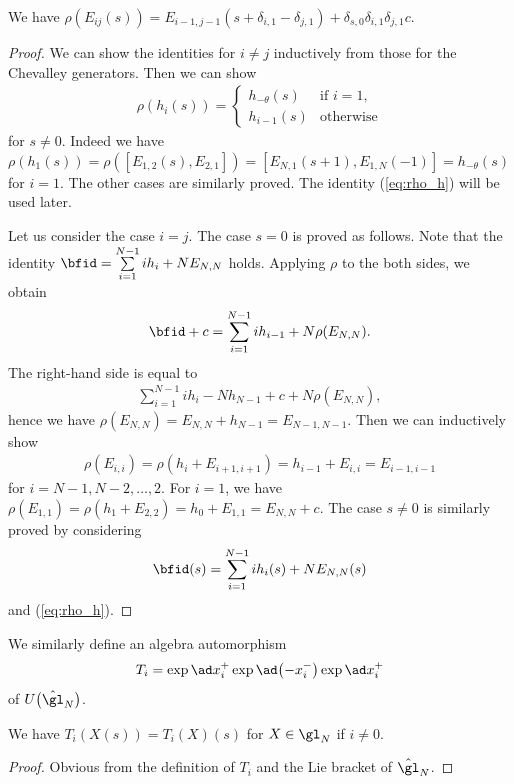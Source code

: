 \begin{lem}\label{lem:rho}We have $\rho(E_{ij}(s)) = E_{i-1,j-1}(s+\delta_{i,1}-\delta_{j,1}) + \delta_{s,0}\delta_{i,1}\delta_{j,1}c$.
\end{lem}
\begin{proof}We can show the identities for $i \neq j$ inductively from those for the Chevalley generators. Then we can show
\begin{gather}
\rho(h_i(s)) = \begin{cases}
h_{-\theta}(s) & \text{if $i=1$},\\
h_{i-1}(s) & \text{otherwise}
\end{cases}\label{eq:rho_h}
\end{gather}
for $s \neq 0$. Indeed we have $\rho(h_1(s)) = \rho([E_{1,2}(s), E_{2,1}]) = [E_{N,1}(s+1), E_{1,N}(-1)] = h_{-\theta}(s)$ for $i=1$. The other cases are similarly proved. The identity (\ref{eq:rho_h}) will be used later.

Let us consider the case $i = j$. The case $s=0$ is proved as follows. Note that the identity $\bfid = \sum\limits_{i=1}^{N-1} i h_i + N E_{N,N}$ holds. Applying $\rho$ to the both sides, we obtain
\begin{gather*}
\bfid + c = \sum_{i=1}^{N-1} i h_{i-1} + N \rho(E_{N,N}).
\end{gather*}
The right-hand side is equal to
\begin{gather*}
\sum_{i=1}^{N-1} i h_i - N h_{N-1} + c + N \rho(E_{N,N}),
\end{gather*}
hence we have $\rho(E_{N,N}) = E_{N,N} + h_{N-1} = E_{N-1,N-1}$. Then we can inductively show
\begin{gather*}
\rho(E_{i,i}) = \rho(h_i + E_{i+1,i+1}) = h_{i-1} + E_{i,i} = E_{i-1,i-1}
\end{gather*}
for $i=N-1,N-2,\ldots,2$. For $i=1$, we have $\rho(E_{1,1}) = \rho(h_1 + E_{2,2}) = h_{0} + E_{1,1} = E_{N,N} + c$. The case $s \neq 0$ is similarly proved by considering
\begin{gather*}
\bfid(s) = \sum_{i=1}^{N-1} i h_i(s) + N E_{N,N}(s)
\end{gather*}
and (\ref{eq:rho_h}).
\end{proof}

We similarly define an algebra automorphism
\begin{gather*}
T_i = \exp\ad x_i^+ \exp\ad\big({-}x_i^-\big) \exp\ad x_i^+
\end{gather*}
of $U\big(\hat{\gl}_N\big)$.

\begin{lem}\label{lem:higher}We have $T_i(X(s))=T_i(X)(s)$ for $X \in \gl_N$ if $i \neq 0$.
\end{lem}
\begin{proof}Obvious from the definition of $T_i$ and the Lie bracket of $\hat{\gl}_N$.
\end{proof}

